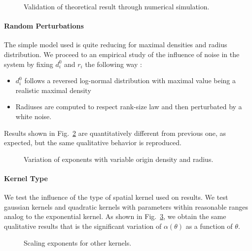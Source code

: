 \begin{figure}
\centering

\caption{Validation of theoretical result through numerical simulation.}
\label{fig:th_results}
\end{figure}



\paragraph{Random Perturbations}

The simple model used is quite reducing for maximal densities and radius distribution. We proceed to an empirical study of the influence of noise in the system by fixing $d_i^0$ and $r_i$ the following way :
\begin{itemize}
\item $d_i^0$ follows a reversed log-normal distribution with maximal value being a realistic maximal density
\item Radiuses are computed to respect rank-size law and then perturbated by a white noise.
\end{itemize}

Results shown in Fig.~\ref{fig:random-density} are quantitatively different from previous one, as expected, but the same qualitative behavior is reproduced.


\begin{figure}
\centering

\caption{Variation of exponents with variable origin density and radius.}
\label{fig:random-density}
\end{figure}



\paragraph{Kernel Type}

We test the influence of the type of spatial kernel used on results. We test gaussian kernels and quadratic kernels with parameters within reasonable ranges analog to the exponential kernel. As shown in Fig.~\ref{fig:other-kernels}, we obtain the same qualitative results that is the significant variation of $\alpha(\theta)$ as a function of $\theta$.


\begin{figure}
\centering

\caption{Scaling exponents for other kernels.}
\label{fig:other-kernels}
\end{figure}





